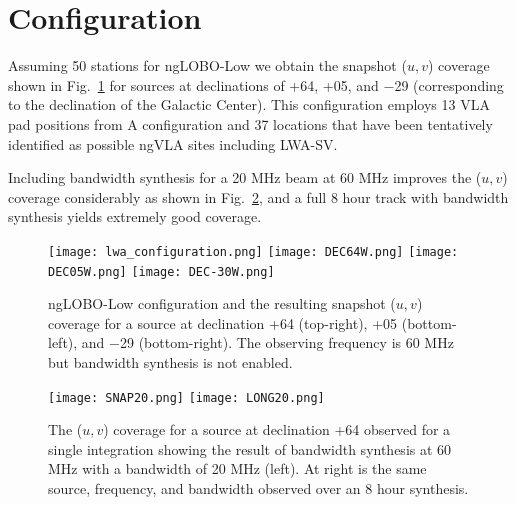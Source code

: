\documentclass[11pt]{article}
\begin{document}
\vspace{-0.5cm}
\section{Configuration}
\vspace{-0.25cm}

Assuming 50 stations for ngLOBO-Low we obtain the snapshot ($u,v$) coverage shown in Fig.~\ref{snapshot} for sources at declinations of +64, +05, and $-$29 (corresponding to the declination of the Galactic Center). This configuration employs 13 VLA pad positions from A configuration and 37 locations that have been tentatively identified as possible ngVLA sites including LWA-SV.  

Including bandwidth synthesis for a 20 MHz beam at 60 MHz improves the ($u,v$) coverage considerably as shown in Fig.~\ref{snap20}, and a full 8 hour track with bandwidth synthesis yields extremely good coverage.


\begin{figure}[t!]
\begin{center}
\vspace{-1cm}
\texttt{[image: lwa\_configuration.png]}
\texttt{[image: DEC64W.png]}
\texttt{[image: DEC05W.png]}
\texttt{[image: DEC-30W.png]}

\end{center}
\vspace{-0.5cm}
  \caption{
ngLOBO-Low configuration and the resulting snapshot  ($u,v$) coverage for a source at declination +64 (top-right), +05 (bottom-left),
and $-$29 (bottom-right).  The observing frequency is 60 MHz but bandwidth synthesis is not enabled.
}
\label{snapshot}
\end{figure}

\begin{figure}[t!]
\begin{center}
\vspace{-1cm}
\texttt{[image: SNAP20.png]}
\texttt{[image: LONG20.png]}

\end{center}
\vspace{-0.5cm}
  \caption{
The ($u,v$) coverage for a source at declination +64 observed for a single integration showing the result of bandwidth synthesis at 60 MHz with a bandwidth of 20 MHz (left).  At right is the same source, frequency, and bandwidth observed over an 8 hour synthesis.
}
\label{snap20}
\end{figure}
\end{document}
